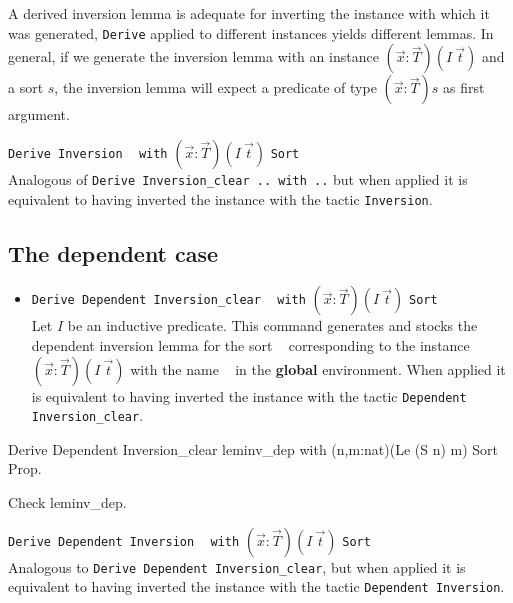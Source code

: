 A derived inversion lemma is  adequate for inverting the instance
with which it was generated,  \texttt{Derive} applied to
different instances yields different lemmas. In general, if we generate
the inversion lemma with 
an instance $(\vec{x}:\vec{T})(I~\vec{t})$ and a sort $s$,  the inversion lemma will
expect a predicate of type $(\vec{x}:\vec{T})s$ as first argument. \\

\begin{Variant}
\item \texttt{Derive Inversion} \ident~ \texttt{with} 
  $(\vec{x}:\vec{T})(I~\vec{t})$ \texttt{Sort} \sort\\ 
     Analogous of \texttt{Derive Inversion\_clear .. with ..} but 
 when applied it is equivalent to having
  inverted the instance with the tactic \texttt{Inversion}.
\end{Variant}

\subsection{The dependent case}
\begin{itemize}
\item \texttt{Derive Dependent Inversion\_clear} \ident~ \texttt{with}
  $(\vec{x}:\vec{T})(I~\vec{t})$ \texttt{Sort} \sort~ \\ 
  Let $I$ be an inductive predicate. This command generates and stocks
  the dependent inversion lemma for the sort  \sort~  corresponding to the instance
  $(\vec{x}:\vec{T})(I~\vec{t})$ with the name \ident~ in the {\bf
    global} environment. When applied it is equivalent to having
  inverted the instance with the tactic \texttt{Dependent Inversion\_clear}.
\end{itemize}

\begin{coq_example}
Derive Dependent Inversion_clear leminv_dep 
  with (n,m:nat)(Le (S n) m) Sort Prop.
\end{coq_example}

\begin{coq_example}
Check leminv_dep.
\end{coq_example}

\begin{Variants}
\item \texttt{Derive Dependent Inversion} \ident~ \texttt{with}
  $(\vec{x}:\vec{T})(I~\vec{t})$ \texttt{Sort} \sort~ \\ 
  Analogous to \texttt{Derive Dependent Inversion\_clear}, but when
  applied  it is equivalent to having
  inverted the instance with the tactic \texttt{Dependent Inversion}.

\end{Variants}

